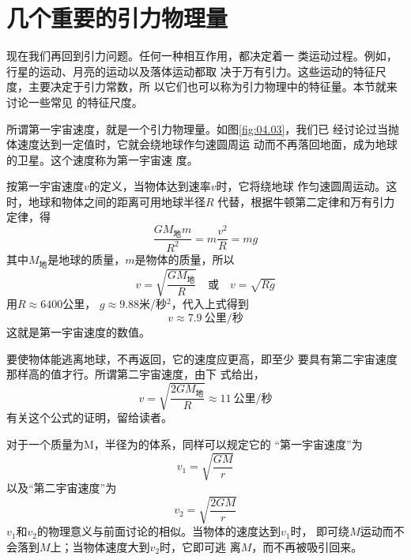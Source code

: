 \section{几个重要的引力物理量}\label{sec:04.05}

现在我们再回到引力问题。任何一种相互作用，都决定着一
类运动过程。例如，行星的运动、月亮的运动以及落体运动都取
决于万有引力。这些运动的特征尺度，主要决定于引力常数，所
以它们也可以称为引力物理中的特征量。本节就来讨论一些常见
的特征尺度。

所谓第一宇宙速度，就是一个引力物理量。如图\ref{fig:04.03}，我们已
经讨论过当抛体速度达到一定值时，它就会绕地球作匀速圆周运
动而不再落回地面，成为地球的卫星。这个速度称为第一宇宙速
度。

按第一宇宙速度$ v $的定义，当物体达到速率$ v $时，它将绕地球
作匀速圆周运动。这时，地球和物体之间的距离可用地球半径$ R $
代替，根据牛顿第二定律和万有引力定律，得
\begin{equation*}
	\frac { G M _ \text{地} m } { R ^ { 2 } } = m \frac { v ^ { 2 } } { R } = m g
\end{equation*}
其中$ M _ \text{地} $是地球的质量，$ m $是物体的质量，所以
\begin{equation}\label{eqn:04.05.01}
	v = \sqrt {  \frac { G M _ { \text{地} } } { R }}
\quad \text{或} \quad v = \sqrt { R g }
\end{equation}
用$ R\approx 6400 $公里， $ g \approx 9.88 $米/秒$ ^2 $，代入上式得到
\begin{equation*}
	v \approx 7.9 ~\text{公里/秒}
\end{equation*}
这就是第一宇宙速度的数值。

要使物体能逃离地球，不再返回，它的速度应更高，即至少
要具有第二宇宙速度那样高的值才行。所谓第二宇宙速度，由下
式给出，
\begin{equation*}
	v = \sqrt{\frac { 2 G M _ { \text{地} } } { R }} \approx 11 ~\text{公里/秒}
\end{equation*}
有关这个公式的证明，留给读者。

对于一个质量为M，半径为的体系，同样可以规定它的
“第一宇宙速度”为
\begin{equation}\label{eqn:04.05.02}
	v _ { 1 } = \sqrt {\frac { G M } { r }}
\end{equation}
以及“第二宇宙速度”为
\begin{equation}\label{eqn:04.05.03}
	v _ { 2 } = \sqrt {\frac { 2 G M } { r }}
\end{equation}
$ v_1 $和$  v _ 2 $的物理意义与前面讨论的相似。当物体的速度达到$ v_1 $时，
即可绕$ M $运动而不会落到$ M $上；当物体速度大到$ v_2 $时，它即可逃
离$ M $，而不再被吸引回来。

